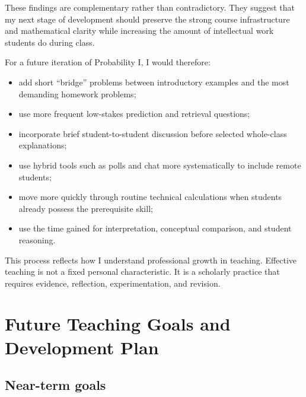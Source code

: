 \documentclass[11pt]{article}
\begin{document}
These findings are complementary rather than contradictory.
They suggest that my next stage of development should preserve
the strong course infrastructure and mathematical clarity
while increasing the amount of intellectual work students do
during class.

For a future iteration of Probability I,
I would therefore:

\begin{itemize}

    \item add short ``bridge'' problems between introductory
    examples and the most demanding homework problems;

    \item use more frequent low-stakes prediction and retrieval
    questions;

    \item incorporate brief student-to-student discussion before
    selected whole-class explanations;

    \item use hybrid tools such as polls and chat more
    systematically to include remote students;

    \item move more quickly through routine technical
    calculations when students already possess the prerequisite
    skill;

    \item use the time gained for interpretation,
    conceptual comparison,
    and student reasoning.

\end{itemize}

This process reflects how I understand professional growth in
teaching.
Effective teaching is not a fixed personal characteristic.
It is a scholarly practice that requires evidence,
reflection,
experimentation,
and revision.


\section{Future Teaching Goals and Development Plan}

\subsection{Near-term goals}
\end{document}

